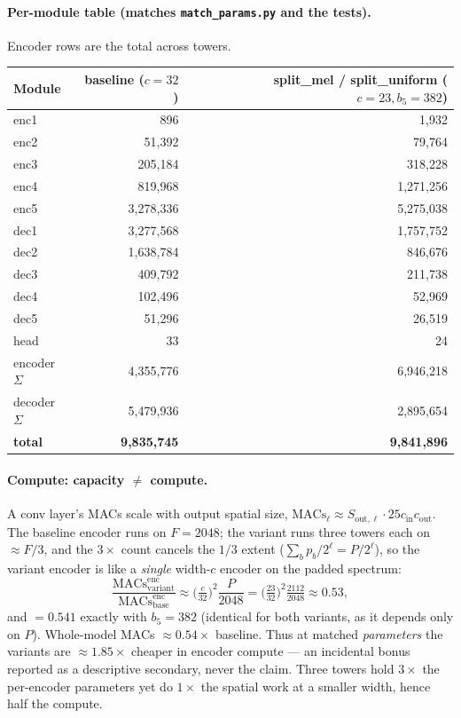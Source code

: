 \documentclass[11pt]{article}
\newcommand{\code}[1]{\texttt{#1}}
\begin{document}
\paragraph{Per-module table (matches \code{match\_params.py} and the tests).}
Encoder rows are the total across towers.
\begin{center}
\begin{tabular}{lrr}
Module & baseline ($c{=}32$) & split\_mel / split\_uniform ($c{=}23,b_5{=}382$)\\\hline
enc1 & 896 & 1{,}932\\
enc2 & 51{,}392 & 79{,}764\\
enc3 & 205{,}184 & 318{,}228\\
enc4 & 819{,}968 & 1{,}271{,}256\\
enc5 & 3{,}278{,}336 & 5{,}275{,}038\\
dec1 & 3{,}277{,}568 & 1{,}757{,}752\\
dec2 & 1{,}638{,}784 & 846{,}676\\
dec3 & 409{,}792 & 211{,}738\\
dec4 & 102{,}496 & 52{,}969\\
dec5 & 51{,}296 & 26{,}519\\
head & 33 & 24\\\hline
encoder $\Sigma$ & 4{,}355{,}776 & 6{,}946{,}218\\
decoder $\Sigma$ & 5{,}479{,}936 & 2{,}895{,}654\\
\textbf{total} & \textbf{9{,}835{,}745} & \textbf{9{,}841{,}896}\\
\end{tabular}
\end{center}

\paragraph{Compute: capacity $\ne$ compute.} A conv layer's MACs scale with output
spatial size, $\text{MACs}_\ell\approx S_{\text{out},\ell}\cdot25c_{\text{in}}
c_{\text{out}}$. The baseline encoder runs on $F=2048$; the variant runs three
towers each on $\approx F/3$, and the $3\times$ count cancels the $1/3$ extent
($\sum_b p_b/2^\ell=P/2^\ell$), so the variant encoder is like a \emph{single}
width-$c$ encoder on the padded spectrum:
\[
\frac{\text{MACs}^{\text{enc}}_{\text{variant}}}{\text{MACs}^{\text{enc}}_{\text{base}}}
\approx\Big(\tfrac{c}{32}\Big)^2\frac{P}{2048}
=\Big(\tfrac{23}{32}\Big)^2\tfrac{2112}{2048}\approx0.53,
\]
and $=0.541$ exactly with $b_5=382$ (identical for both variants, as it depends
only on $P$). Whole-model MACs $\approx0.54\times$ baseline. Thus at matched
\emph{parameters} the variants are $\approx1.85\times$ cheaper in encoder compute
--- an incidental bonus reported as a descriptive secondary, never the claim.
Three towers hold $3\times$ the per-encoder parameters yet do $1\times$ the spatial
work at a smaller width, hence half the compute.
\end{document}
